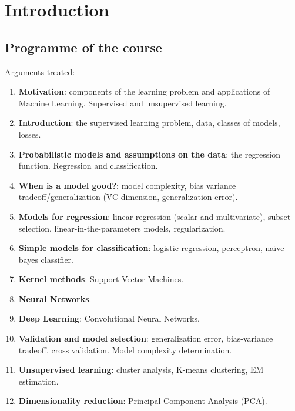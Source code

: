 \documentclass[../../main/main.tex]{subfiles}
\begin{document}
\chapter*{Introduction}




\section{Programme of the course}

Arguments treated:

\begin{enumerate}
	\item \textbf{Motivation}: components of the learning problem and applications of Machine Learning. Supervised and unsupervised learning.
	\item \textbf{Introduction}: the supervised learning problem, data, classes of models, losses.
	\item \textbf{Probabilistic models and assumptions on the data}: the regression function. Regression and classification.
	\item \textbf{When is a model good?}: model complexity, bias variance tradeoff/generalization (VC dimension, generalization error).
	\item \textbf{Models for regression}: linear regression (scalar and multivariate), subset selection, linear-in-the-parameters models, regularization.
	\item \textbf{Simple models for classification}: logistic regression, perceptron, naïve bayes classifier.
	\item \textbf{Kernel methods}: Support Vector Machines.
	\item \textbf{Neural Networks}.
	\item \textbf{Deep Learning}: Convolutional Neural Networks.
	\item \textbf{Validation and model selection}: generalization error, bias-variance tradeoff, cross validation. Model complexity determination.
	\item \textbf{Unsupervised learning}: cluster analysis, K-means clustering, EM estimation.
	\item \textbf{Dimensionality reduction}: Principal Component Analysis (PCA).
\end{enumerate}
\end{document}
